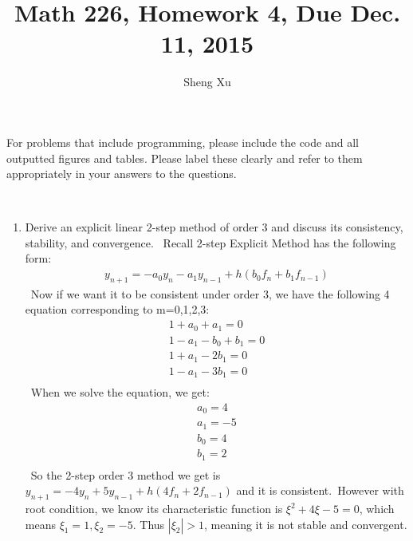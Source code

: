 \documentclass[12pt]{amsart}
\numberwithin{equation}{section}
\numberwithin{table}{section}
\numberwithin{figure}{section}
\numberwithin{algorithm}{section}
\begin{document}
\title[]{Math 226, Homework 4, Due Dec. 11, 2015}
\author{Sheng Xu}

\maketitle


For problems that include programming, please include the code and all outputted figures and tables.  Please label these clearly and refer to them appropriately in your answers to the questions.

\


\begin{enumerate}

\item Derive an explicit linear 2-step method of order 3 and discuss its consistency, stability, and convergence.
\
Recall 2-step Explicit Method has the following form:\
\begin{align*}
y_{n+1}=-a_0y_n-a_1y_{n-1}+h(b_0f_n+b_1f_{n-1})
\end{align*}\
Now if we want it to be consistent under order 3, we have the following 4 equation corresponding to m=0,1,2,3:
\begin{align*}
1+a_0+a_1=0\\
1-a_1-b_0+b_1=0\\
1+a_1-2b_1=0\\
1-a_1-3b_1=0\\
\end{align*}\
When we solve the equation, we get:
\begin{align*}
a_0=4\\
a_1=-5\\
b_0=4\\
b_1=2\\
\end{align*}\
So the 2-step order 3 method we get is $y_{n+1}=-4y_n+5y_{n-1}+h(4f_n+2f_{n-1})$ and it is consistent.\
However with root condition, we know its characteristic function is $\xi^2+4\xi-5=0$, which means $\xi_1=1,\xi_2=-5$. Thus $|\xi_2|>1$, meaning it is not stable and convergent.
\


\end{enumerate}
\end{document}
